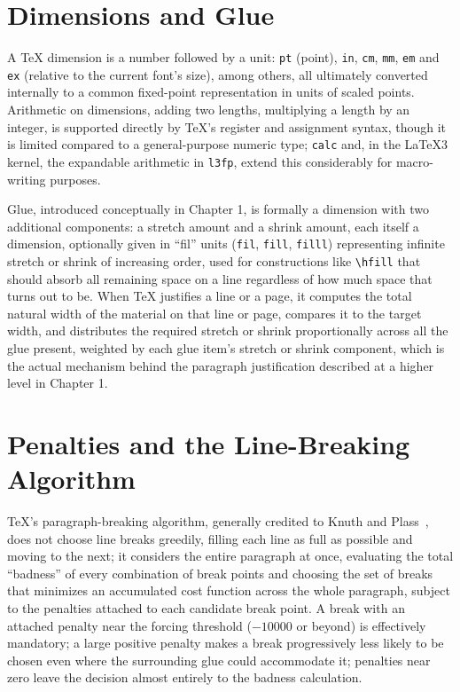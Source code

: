 \hypertarget{a.6-dimensions-and-glue}{%
\section{Dimensions and Glue}\label{a.6-dimensions-and-glue}}

A TeX dimension is a number followed by a unit: \texttt{pt} (point), \texttt{in}, \texttt{cm}, \texttt{mm}, \texttt{em} and \texttt{ex} (relative to the current font's size), among others, all ultimately converted internally to a common fixed-point representation in units of scaled points. Arithmetic on dimensions, adding two lengths, multiplying a length by an integer, is supported directly by TeX's register and assignment syntax, though it is limited compared to a general-purpose numeric type; \texttt{calc} and, in the LaTeX3 kernel, the expandable arithmetic in \texttt{l3fp}, extend this considerably for macro-writing purposes.

Glue, introduced conceptually in Chapter 1, is formally a dimension with two additional components: a stretch amount and a shrink amount, each itself a dimension, optionally given in ``fil'' units (\texttt{fil}, \texttt{fill}, \texttt{filll}) representing infinite stretch or shrink of increasing order, used for constructions like \texttt{\textbackslash{}hfill} that should absorb all remaining space on a line regardless of how much space that turns out to be. When TeX justifies a line or a page, it computes the total natural width of the material on that line or page, compares it to the target width, and distributes the required stretch or shrink proportionally across all the glue present, weighted by each glue item's stretch or shrink component, which is the actual mechanism behind the paragraph justification described at a higher level in Chapter 1.

\hypertarget{a.7-penalties-and-the-line-breaking-algorithm}{%
\section{Penalties and the Line-Breaking Algorithm}\label{a.7-penalties-and-the-line-breaking-algorithm}}

TeX's paragraph-breaking algorithm, generally credited to Knuth and Plass~\cite{knuthplass1981}, does not choose line breaks greedily, filling each line as full as possible and moving to the next; it considers the entire paragraph at once, evaluating the total ``badness'' of every combination of break points and choosing the set of breaks that minimizes an accumulated cost function across the whole paragraph, subject to the penalties attached to each candidate break point. A break with an attached penalty near the forcing threshold (\(-10000\) or beyond) is effectively mandatory; a large positive penalty makes a break progressively less likely to be chosen even where the surrounding glue could accommodate it; penalties near zero leave the decision almost entirely to the badness calculation.

